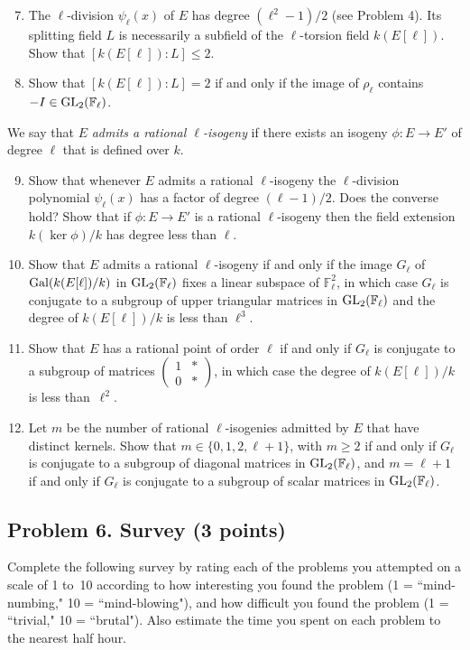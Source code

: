 \documentclass[11pt]{article}
\newcommand{\Fl}{\mathbb{F}_\ell}
\newcommand{\Gal}{{\rm Gal}}
\newcommand{\GL}{{\rm GL}}
\begin{document}
\begin{enumerate}[{\bf(a)}]
\setcounter{enumi}{6}
\item The $\ell$-division $\psi_\ell(x)$ of $E$ has degree $(\ell^2-1)/2$ (see Problem 4).
Its splitting field $L$ is necessarily a subfield of the $\ell$-torsion field $k(E[\ell])$.
Show that $[k(E[\ell])\!:\!L]\le 2$.
\item Show that $[k(E[\ell])\!:\!L]= 2$ if and only if the image of $\rho_\ell$ contains $-I\in \GL_2(\Fl)$.
\end{enumerate}
We say that $E$ \emph{admits a rational $\ell$-isogeny} if there exists an isogeny $\phi\colon E\to E'$ of degree $\ell$ that is defined over $k$.  
\begin{enumerate}[{\bf(a)}]
\setcounter{enumi}{8}
\item Show that whenever $E$ admits a rational $\ell$-isogeny the $\ell$-division polynomial $\psi_\ell(x)$ has a factor of degree $(\ell-1)/2$.  Does the converse hold?  Show that if $\phi\colon E\to E'$ is a rational $\ell$-isogeny then the field extension $k(\ker\phi)/k$ has degree less than $\ell$.
\item Show that $E$ admits a rational $\ell$-isogeny if and only if the image $G_\ell$ of $\Gal(k(E[\ell])/k)$ in $\GL_2(\Fl)$ fixes a linear subspace of $\Fl^2$, in which case $G_\ell$ is conjugate to a subgroup of upper triangular matrices in $\GL_2(\Fl)$ and the degree of $k(E[\ell])/k$ is less than $\ell^3$.
\item Show that $E$ has a rational point of order $\ell$ if and only if $G_\ell$ is conjugate to a subgroup of matrices $\left(\begin{smallmatrix}1&*\\0&*\end{smallmatrix}\right)$, in which case the degree of $k(E[\ell])/k$ is less than~$\ell^2$.
\item Let $m$ be the number of rational $\ell$-isogenies admitted by $E$ that have distinct kernels.  Show that $m\in \{0,1,2,\ell+1\}$, with $m\ge 2$ if and only if $G_\ell$ is conjugate to a subgroup of diagonal matrices in $\GL_2(\Fl)$, and $m=\ell+1$ if and only if $G_\ell$ is conjugate to a subgroup of scalar matrices in $\GL_2(\Fl)$.
\end{enumerate}

\subsection*{Problem 6. Survey (3 points)}
Complete the following survey by rating each of the problems you attempted on a scale of 1 to~10 according to how interesting you found the problem (1 = ``mind-numbing," 10 = ``mind-blowing"), and how difficult you found the problem (1 = ``trivial," 10 = ``brutal").  Also estimate the time you spent on each problem to the nearest half hour.
\end{document}

